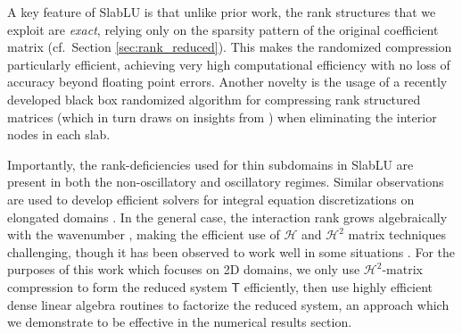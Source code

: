 \documentclass[11pt]{amsart}
\newtheorem{remark}{Remark}%
\newcommand{\mtx}[1]{\bm{\mathsf{#1}}}
\begin{document}
A key feature of SlabLU is that unlike prior work, the rank structures that we exploit are \textit{exact}, relying only on the sparsity pattern of the original coefficient matrix (cf.~Section \ref{sec:rank_reduced}).
This makes the randomized compression particularly efficient, achieving very high computational efficiency with no loss of accuracy beyond floating point errors. 
Another novelty is the usage of a recently developed black box randomized algorithm for compressing rank structured matrices \cite{levitt2022linear} (which in turn draws on insights from \cite{2011_lin_lu_ying,2016_martinsson_hudson2,2011_martinsson_randomhudson}) when eliminating the interior nodes in each slab.

Importantly, the rank-deficiencies used for thin subdomains in SlabLU are present in both the non-oscillatory and oscillatory regimes.
Similar observations are used to develop
efficient solvers for integral equation discretizations on elongated domains \cite{1996_mich_elongated,2007_martinsson_elongated}.
In the general case, the interaction rank grows algebraically with the
wavenumber \cite{engquist2018approximate}, making the efficient use of $\mathcal H$ and $\mathcal H^2$ matrix techniques challenging, though it has been observed to work well in some situations \cite{banjai2008hierarchical,betcke2017computationally,2011_xia_dehoop}. For the purposes of this work which focuses on 2D domains, 
we only use $\mathcal H^2$-matrix compression to form the reduced system $\mtx T$ efficiently,
then use highly efficient dense linear algebra routines to factorize the reduced system, an approach which we demonstrate to be effective
in the numerical results section.



\end{document}
